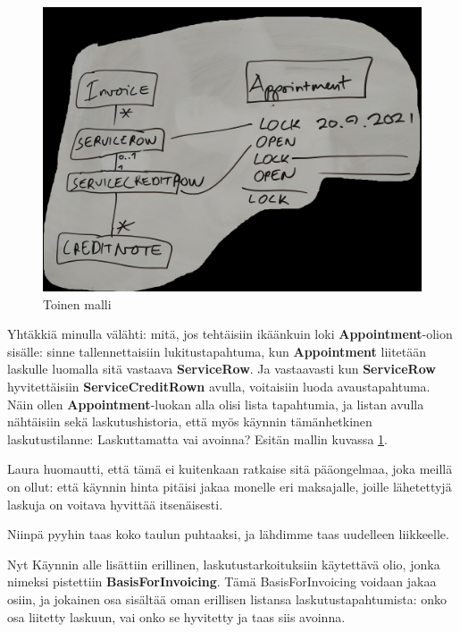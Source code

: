 \begin{figure}
\centering
\includegraphics[width=\textwidth,height=0.5\textheight]{illustration/malli2.jpg}
\caption{\label{malli2}Toinen malli}
\end{figure}

Yhtäkkiä minulla välähti: mitä, jos tehtäisiin ikäänkuin loki
\textbf{Appointment}-olion sisälle: sinne tallennettaisiin
lukitustapahtuma, kun \textbf{Appointment} liitetään laskulle luomalla
sitä vastaava \textbf{ServiceRow}. Ja vastaavasti kun
\textbf{ServiceRow} hyvitettäisiin \textbf{ServiceCreditRown} avulla,
voitaisiin luoda avaustapahtuma. Näin ollen \textbf{Appointment}-luokan
alla olisi lista tapahtumia, ja listan avulla nähtäisiin sekä
laskutushistoria, että myös käynnin tämänhetkinen laskutustilanne:
Laskuttamatta vai avoinna? Esitän mallin kuvassa \ref{malli2}.

Laura huomautti, että tämä ei kuitenkaan ratkaise sitä pääongelmaa, joka
meillä on ollut: että käynnin hinta pitäisi jakaa monelle eri
maksajalle, joille lähetettyjä laskuja on voitava hyvittää itsenäisesti.

Niinpä pyyhin taas koko taulun puhtaaksi, ja lähdimme taas uudelleen
liikkeelle.

Nyt Käynnin alle lisättiin erillinen, laskutustarkoituksiin käytettävä
olio, jonka nimeksi pistettiin \textbf{BasisForInvoicing}. Tämä
BasisForInvoicing voidaan jakaa osiin, ja jokainen osa sisältää oman
erillisen listansa laskutustapahtumista: onko osa liitetty laskuun, vai
onko se hyvitetty ja taas siis avoinna.

